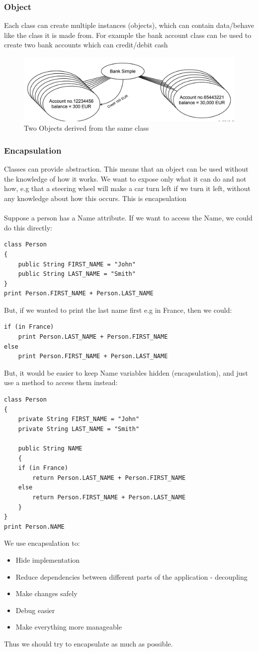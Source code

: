 \documentclass{article}
\begin{document}
\subsubsection{Object}
Each class can create multiple instances (objects), which can contain data/behave like the class it is made from. For example the bank account class can be used to create two bank accounts which can credit/debit cash
\begin{figure}[H]
\centering
\includegraphics[width = 0.5\linewidth]{Pictures/Screenshot 2023-01-25 at 11.46.39.png}
\caption{Two Objects derived from the same class}
\end{figure}
\subsubsection{Encapsulation}
Classes can provide abstraction. This means that an object can be used without the knowledge of how it works. We want to expose only what it can do and not how, e.g that a steering wheel will make a car turn left if we turn it left, without any knowledge about how this occurs. This is encapsulation \\ \\ Suppose a person has a Name attribute. If we want to access the Name, we could do this directly:
\begin{verbatim}
class Person 
{
    public String FIRST_NAME = "John"
    public String LAST_NAME = "Smith"
}
print Person.FIRST_NAME + Person.LAST_NAME
\end{verbatim}
But, if we wanted to print the last name first e.g in France, then we could:
\begin{verbatim}
if (in France)
    print Person.LAST_NAME + Person.FIRST_NAME
else
    print Person.FIRST_NAME + Person.LAST_NAME

\end{verbatim}
But, it would be easier to keep Name variables hidden (encapsulation), and just use a method to access them instead:
\begin{verbatim}
class Person
{
    private String FIRST_NAME = "John"
    private String LAST_NAME = "Smith"

    public String NAME
    {
    if (in France)
        return Person.LAST_NAME + Person.FIRST_NAME
    else 
        return Person.FIRST_NAME + Person.LAST_NAME
    }
}
print Person.NAME
\end{verbatim}
We use encapsulation to:
\begin{itemize}
    \item Hide implementation
    \item Reduce dependencies between different parts of the application - decoupling
    \item Make changes safely
    \item Debug easier
    \item Make everything more manageable
\end{itemize}
Thus we should try to encapsulate as much as possible.
\end{document}
